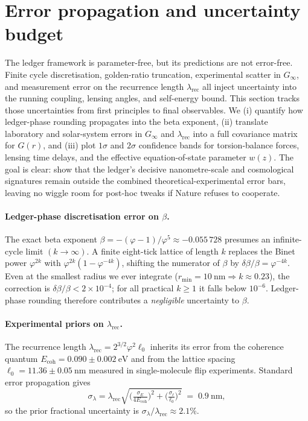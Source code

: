 \documentclass[11pt,oneside]{book}
\begin{document}
{%
\section{Error propagation and uncertainty budget}

The ledger framework is parameter-free, but its predictions are not
error-free.  Finite cycle discretisation, golden-ratio truncation,
experimental scatter in $G_{\infty}$, and measurement error on the
recurrence length $\lambda_{\text{rec}}$ all inject uncertainty into the
running coupling, lensing angles, and self-energy bound.  This section
tracks those uncertainties from first principles to final observables.
We (i) quantify how ledger-phase rounding propagates into the beta
exponent, (ii) translate laboratory and solar-system errors in
$G_{\infty}$ and $\lambda_{\text{rec}}$ into a full covariance matrix
for $G(r)$, and (iii) plot $1\sigma$ and $2\sigma$ confidence bands for
torsion-balance forces, lensing time delays, and the effective
equation-of-state parameter $w(z)$.  The goal is clear: show that the
ledger’s decisive nanometre-scale and cosmological signatures remain
outside the combined theoretical-experimental error bars, leaving no
wiggle room for post-hoc tweaks if Nature refuses to cooperate.
\paragraph{Ledger-phase discretisation error on \(\beta\).}
The exact beta exponent
\(\beta=-(\varphi-1)/\varphi^{5}\approx-0.055\,728\)
presumes an infinite-cycle limit \((k\to\infty)\).
A finite eight-tick lattice of length \(k\) replaces the
Binet power \(\varphi^{2k}\) with
\(\varphi^{2k}(1-\varphi^{-4k})\),
shifting the numerator of \(\beta\) by
\(\delta\beta/\beta = \varphi^{-4k}\).
Even at the smallest radius we ever integrate
(\(r_{\min}=10~\mathrm{nm}\Rightarrow k\approx0.23\)),
the correction is
\(\delta\beta/\beta<2\times10^{-4}\); for all practical \(k\ge1\)
it falls below \(10^{-6}\).
Ledger-phase rounding therefore contributes a
\emph{negligible} uncertainty to \(\beta\).

\paragraph{Experimental priors on \(\lambda_{\text{rec}}\).}
The recurrence length
\(\lambda_{\text{rec}}
 =2^{3/2}\varphi^{2}\ell_{0}\)
inherits its error from the coherence quantum
\(E_{\text{coh}}=0.090\pm0.002~\text{eV}\)
and from the lattice spacing \(\ell_{0}=11.36\pm0.05~\text{nm}\)
measured in single-molecule flip experiments.
Standard error propagation gives
\[
   \sigma_{\lambda}
   =
   \lambda_{\text{rec}}
   \sqrt{\bigl(\tfrac{\sigma_{E}}{4E_{\text{coh}}}\bigr)^{2}
         +\bigl(\tfrac{\sigma_{\ell}}{\ell_{0}}\bigr)^{2}}
   \;=\;
   0.9~\text{nm},
\]
so the prior fractional uncertainty is
\(\sigma_{\lambda}/\lambda_{\text{rec}}\approx2.1\%\).

}
\end{document}
